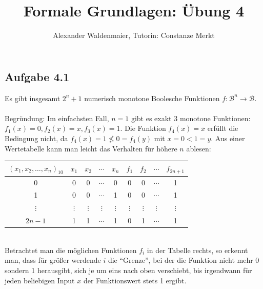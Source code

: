 \documentclass{article}
\title{Formale Grundlagen: Übung 4}
\author{Alexander Waldenmaier, Tutorin: Constanze Merkt}
\begin{document}
    \maketitle

    \subsection*{Aufgabe 4.1}
    Es gibt insgesamt $2^n+1$ numerisch monotone Boolesche Funktionen $f:\mathcal{B}^n \rightarrow \mathcal{B}$. \\\\
    Begründung: Im einfachsten Fall, $n=1$ gibt es exakt 3 monotone Funktionen: $f_1(x) = 0, f_2(x) = x, f_3(x) = 1$. Die Funktion $f_4(x) = \overline{x}$ erfüllt die Bedingung nicht, da $f_4(x)=1 \nleq 0=f_4(y)$ mit $x=0<1=y$. Aus einer Wertetabelle kann man leicht das Verhalten für höhere $n$ ablesen: 
    \begin{table}[h]
        \centering
        \begin{tabular}{c|cccc||cccc}
            $(x_1, x_2, \ldots, x_n)_{10}$ & $x_1$ & $x_2$ & $\cdots$ & $x_n$ & $f_1$ & $f_2$ & $\cdots$ & $f_{2n+1}$\\ \hline
            0 & 0 & 0 & $\cdots$ & 0 & 0 & 0 & $\cdots$ & 1 \\
            1 & 0 & 0 & $\cdots$ & 1 & 0 & 0 & $\cdots$ & 1 \\
            $\vdots$ & $\vdots$ & $\vdots$ & $\vdots$ & $\vdots$ & $\vdots$ & $\vdots$ & $\vdots$ & $\vdots$ \\
            $2n-1$ & 1 & 1 & $\cdots$ & 1 & 0 & 1 & $\cdots$ & 1 \\
        \end{tabular}
    \end{table}\\
    Betrachtet man die möglichen Funktionen $f_i$ in der Tabelle rechts, so erkennt man, dass für größer werdende $i$ die "`Grenze"', bei der die Funktion nicht mehr 0 sondern 1 herausgibt, sich je um eins nach oben verschiebt, bis irgendwann für jeden beliebigen Input $x$ der Funktionswert stets 1 ergibt. 
\end{document}
